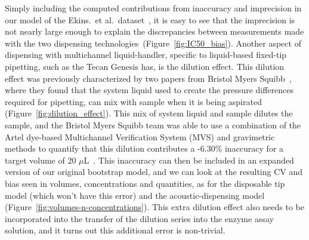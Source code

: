 \documentclass[aps,pre,twocolumn,nofootinbib,superscriptaddress,linenumbers]{revtex4-1}
\begin{document}
Simply including the computed contributions from inaccuracy and imprecision in our model of the  Ekins.~et al.~dataset~\cite{ekins_dispensing_2013}, it is easy to see that the imprecision is not nearly large enough to explain the discrepancies between measurements made with the two dispensing technologies~(Figure~\ref{fig:IC50_bias}).
Another aspect of dispensing with multichannel liquid-handler, specific to liquid-based fixed-tip pipetting, such as the Tecan Genesis has, is the dilution effect. 
This dilution effect was previously characterized by two papers from Bristol Myers Squibb~\cite{dong_use_2006,gu_dilution_2007}, where they found that the system liquid used to create the pressure differences required for pipetting, can mix with sample when it is being aspirated (Figure~\ref{fig:dilution_effect}). 
This mix of system liquid and sample dilutes the sample, and the Bristol Myers Squibb team was able to use a combination of the Artel dye-based Multichannel Verification System (MVS) and gravimetric methods to quantify that this dilution contributes a -6.30\% inaccuracy for a target volume of 20 $\mu$L~\cite{dong_use_2006}.
This inaccuracy can then be included in an expanded version of our original bootstrap model, and we can look at the resulting CV and bias seen in volumes, concentrations and quantities, as for the disposable tip model (which won't have this error) and the acoustic-dispensing model (Figure~\ref{fig:volumes-n-concentrations}).
This extra dilution effect also needs to be incorporated into the transfer of the dilution series into the enzyme assay solution, and it turns out this additional error is non-trivial.
\end{document}
